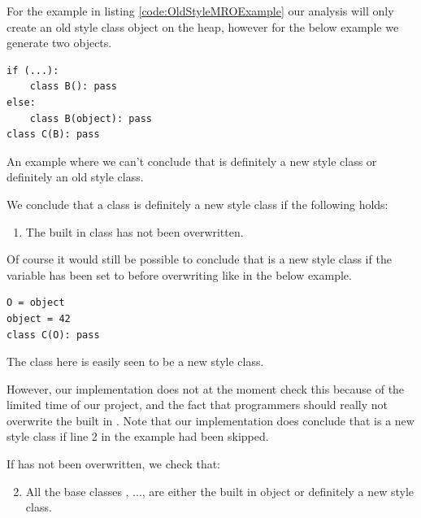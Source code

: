 For the example in listing \ref{code:OldStyleMROExample} our analysis will only create an old style class object on the heap, however for the below example we generate two objects.

\begin{listing}[H]
	\begin{verbatim}
if (...):
	class B(): pass
else:
	class B(object): pass
class C(B): pass
	\end{verbatim}
	\caption{An example where we can't conclude that  is definitely a new style class or definitely an old style class.}\label{code:NotDefinatelyNewOldStyleClass}
\end{listing}

We conclude that a class is definitely a new style class if the following holds:

\begin{enumerate}
	\item The built in class  has not been overwritten.
\end{enumerate}

Of course it would still be possible to conclude that  is a new style class if the variable  has been set to  before overwriting  like in the below example.

\begin{listing}[H]
	\begin{verbatim}
O = object
object = 42
class C(O): pass
	\end{verbatim}
	\caption{The class  here is easily seen to be a new style class.}\label{code:ClassOverwrittenObject}
\end{listing}

However, our implementation does not at the moment check this because of the limited time of our project, and the fact that programmers should really not overwrite the built in . Note that our implementation does conclude that  is a new style class if line 2 in the example had been skipped.

If  has not been overwritten, we check that:

\begin{enumerate}
\setcounter{enumi}{1}
	\item All the base classes , ...,  are either the built in object or definitely a new style class.
\end{enumerate}

